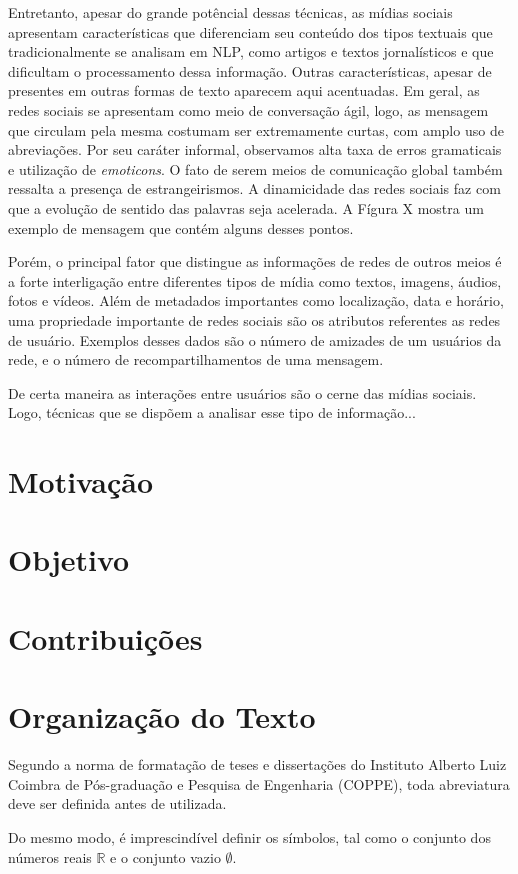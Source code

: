 Entretanto, apesar do grande potêncial dessas técnicas, as mídias sociais
apresentam características que diferenciam seu conteúdo dos tipos textuais que
tradicionalmente se analisam em NLP, como artigos e textos jornalísticos e que
dificultam o processamento dessa informação.
Outras características, apesar de presentes em outras formas de texto aparecem
aqui acentuadas.
Em geral, as redes sociais se apresentam como meio de conversação ágil, logo,
as mensagem que circulam pela mesma costumam ser extremamente curtas, com amplo
uso de abreviações.
Por seu caráter informal, observamos alta taxa de erros gramaticais e utilização
de \textit{emoticons}.
O fato de serem meios de comunicação global também ressalta a presença de
estrangeirismos.
A dinamicidade das redes sociais faz com que a evolução de sentido das palavras
seja acelerada.
A Fígura X mostra um exemplo de mensagem que contém alguns desses pontos.

Porém, o principal fator que distingue as informações de redes de outros meios é
a forte interligação entre diferentes tipos de mídia como textos, imagens,
áudios, fotos e vídeos.
Além de metadados importantes como localização, data e horário, uma propriedade
importante de redes sociais são os atributos referentes as redes de usuário.
Exemplos desses dados são o número de amizades de um usuários da rede, e o
número de recompartilhamentos de uma mensagem.

De certa maneira as interações entre usuários são o cerne das mídias sociais.
Logo, técnicas que se dispõem a analisar esse tipo de informação...

\section{Motivação}
\section{Objetivo}
\section{Contribuições}
\section{Organização do Texto}


Segundo a norma de formata{\c c}\~ao de teses e disserta{\c c}\~oes do
Instituto Alberto Luiz Coimbra de P\'os-gradua{\c c}\~ao e Pesquisa de
Engenharia (COPPE), toda abreviatura deve ser definida antes de
utilizada.

Do mesmo modo, \'e imprescind\'ivel definir os s\'imbolos, tal como o
conjunto dos n\'umeros reais $\mathbb{R}$ e o conjunto vazio $\emptyset$.
